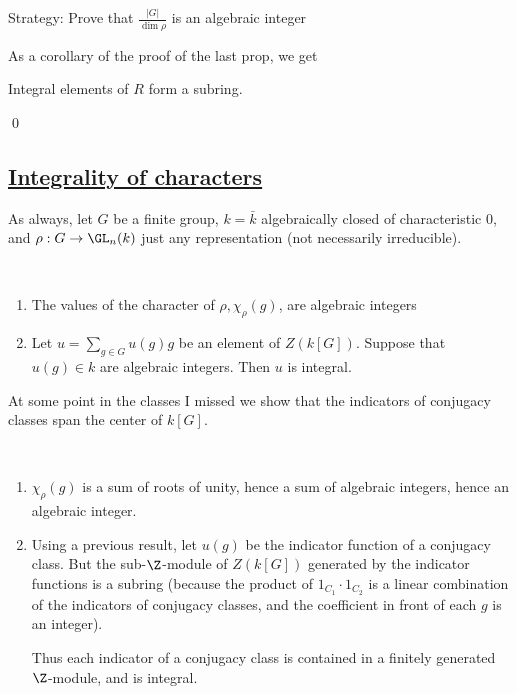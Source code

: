\documentclass[x11names,reqno,14pt]{extarticle}
\newcommand{\bark}{\bar{k}}
\begin{document}
Strategy: Prove that $\frac{|G|}{\dim\rho}$ is an algebraic integer

As a corollary of the proof of the last prop, we get

\cor

Integral elements of $R$ form a subring. 

\proof

\qed

\subsection*{\underline{Integrality of characters}}

As always, let $G$ be a finite group, $k = \bark$ algebraically closed of characteristic 0, and $\rho:G\to\GL_n(k)$ just any representation (not necessarily irreducible).

\prop
\,
\begin{enumerate}

\item The values of the character of $\rho, \chi_\rho(g)$, are algebraic integers

\item Let $u = \sum_{g\in G}u(g)g$ be an element of $Z(k[G])$. Suppose that $u(g) \in k$ are algebraic integers. Then $u$ is integral. 

\end{enumerate}

At some point in the classes I missed we show that the indicators of conjugacy classes span the center of $k[G]$. 

\proof
\,
\begin{enumerate}

\item $\chi_\rho(g)$ is a sum of roots of unity, hence a sum of algebraic integers, hence an algebraic integer.

\item Using a previous result, let $u(g)$ be the indicator function of a conjugacy class. But the sub-$\Z$-module of $Z(k[G])$ generated by the indicator functions is a subring (because the product of $1_{C_1}\cdot 1_{C_2}$ is a linear combination of the indicators of conjugacy classes, and the coefficient in front of each $g$ is an integer). 

Thus each indicator of a conjugacy class is contained in a finitely generated $\Z$-module, and is integral. 

\end{enumerate}
\end{document}
